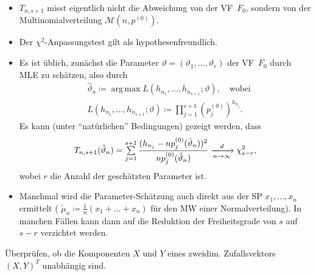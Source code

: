 \documentclass{cheat-sheet}
\DeclareMathOperator*{\argmax}{arg\,max}
\newcommand{\MN}{\mathcal{M}} %
\begin{document}
\begin{bemn}
  \begin{itemize}
    \item $T_{n,s+1}$ misst eigentlich nicht die Abweichung von der VF~$F_0$, sondern von der Multinomialverteilung $\MN(n, p^{(0)})$.
    \item Der $\chi^2$-Anpassungstest gilt als hypothesenfreundlich.
    \item Es ist üblich, zunächst die Parameter $\vartheta = (\vartheta_1, \ldots, \vartheta_r)$ der VF~$F_0$ durch MLE zu schätzen, also durch
    \begin{align*}
      & \hat{\vartheta}_n \coloneqq \argmax L(h_{n_1}, \ldots, h_{n_{s+1}}; \vartheta), \quad \text{wobei} \\
      & L(h_{n_1}, \ldots, h_{n_{s+1}}; \vartheta) \coloneqq \prod_{j=1}^{s+1} \left( p_j^{(0)} \right)^{h_{n_j}}.
    \end{align*}
    Es kann (unter "`natürlichen"' Bedingungen) gezeigt werden, dass
    \[ T_{n,s+1}(\hat{\vartheta}_n) = \sum_{j=1}^{s+1} \frac{(h_{n_j} - n p_j^{(0)}(\hat{\vartheta}_n))^2}{n p_j^{(0)}(\hat{\vartheta}_n)} \xra[n \to \infty]{d} \chi_{s-r}^2, \]
    wobei $r$ die Anzahl der geschätzten Parameter ist. %
    \item Manchmal wird die Parameter-Schätzung auch direkt aus der SP $x_1, \ldots, x_n$ ermittelt (\zB{} $\tilde{\mu}_n \coloneqq \tfrac{1}{n} (x_1 + \ldots + x_n)$ für den MW einer Normalverteilung).
    In manchen Fällen kann dann auf die Reduktion der Freiheitsgrade von $s$ auf $s-r$ verzichtet werden.
  \end{itemize}
\end{bemn}



\begin{ziel}
  Überprüfen, ob die Komponenten $X$ und $Y$ eines zweidim. Zufallsvektors $(X, Y)^T$ unabhängig sind.
\end{ziel}
\end{document}
